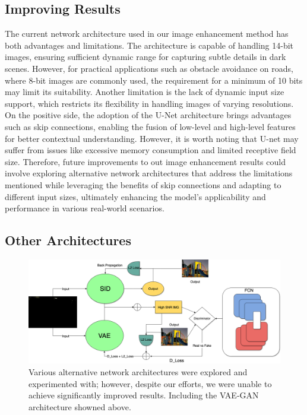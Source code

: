 \documentclass{article}
\begin{document}
\subsection{Improving Results}
The current network architecture used in our image enhancement method has both advantages and limitations. The architecture is capable of handling 14-bit images, ensuring sufficient dynamic range for capturing subtle details in dark scenes. However, for practical applications such as obstacle avoidance on roads, where 8-bit images are commonly used, the requirement for a minimum of 10 bits may limit its suitability. Another limitation is the lack of dynamic input size support, which restricts its flexibility in handling images of varying resolutions. On the positive side, the adoption of the U-Net architecture brings advantages such as skip connections, enabling the fusion of low-level and high-level features for better contextual understanding. However, it is worth noting that U-net may suffer from issues like excessive memory consumption and limited receptive field size. Therefore, future improvements to out image enhancement results could involve exploring alternative network architectures that address the limitations mentioned while leveraging the benefits of skip connections and adapting to different input sizes, ultimately enhancing the model's applicability and performance in various real-world scenarios.
\subsection{Other Architectures}
\begin{figure}[t]
  \centering
  \includegraphics[width=\textwidth]{VAE Diagram.drawio.png} %
  \caption{Various alternative network architectures were explored and experimented with; however, despite our efforts, we were unable to achieve significantly improved results. Including the VAE-GAN architecture showned above.}
  \label{fig:vae-diagram}
\end{figure}
\end{document}
